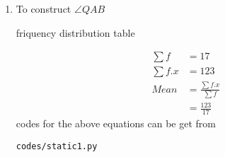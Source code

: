 \renewcommand{\theequation}{\theenumi}
\begin{enumerate}[label=\arabic*.,ref=\thesubsection.\theenumi]
\item 
\begin{table}[!ht]
\centering

\caption{To construct $\angle QAB$}
\caption{friquency distribution table }
\end{table}
\begin{align}
\sum{f} &= 17
\\
\sum{f.x} &= 123 
\\
Mean &= \frac{\sum{f.x}}{\sum{f}}
\\&= \frac{123}{17}
\end{align}
codes for the above equations can be get from
\begin{lstlisting}
codes/static1.py
\end{lstlisting}
\end{enumerate}